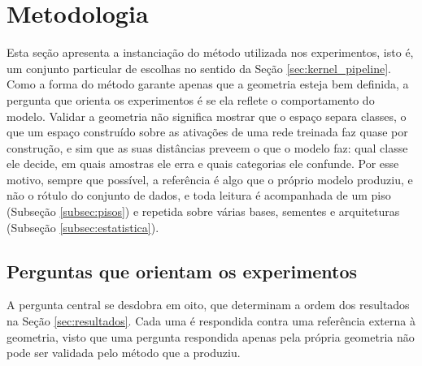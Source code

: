 \section{Metodologia}\label{sec:metodologia}

Esta seção apresenta a instanciação do método utilizada nos experimentos, isto é, um conjunto particular de escolhas no sentido da Seção \ref{sec:kernel_pipeline}. Como a forma do método garante apenas que a geometria esteja bem definida, a pergunta que orienta os experimentos é se ela reflete o comportamento do modelo. Validar a geometria não significa mostrar que o espaço separa classes, o que um espaço construído sobre as ativações de uma rede treinada faz quase por construção, e sim que as suas distâncias preveem o que o modelo faz: qual classe ele decide, em quais amostras ele erra e quais categorias ele confunde. Por esse motivo, sempre que possível, a referência é algo que o próprio modelo produziu, e não o rótulo do conjunto de dados, e toda leitura é acompanhada de um piso (Subseção \ref{subsec:pisos}) e repetida sobre várias bases, sementes e arquiteturas (Subseção \ref{subsec:estatistica}).

\subsection{Perguntas que orientam os experimentos}\label{subsec:perguntas}

A pergunta central se desdobra em oito, que determinam a ordem dos resultados na Seção \ref{sec:resultados}. Cada uma é respondida contra uma referência externa à geometria, visto que uma pergunta respondida apenas pela própria geometria não pode ser validada pelo método que a produziu.


